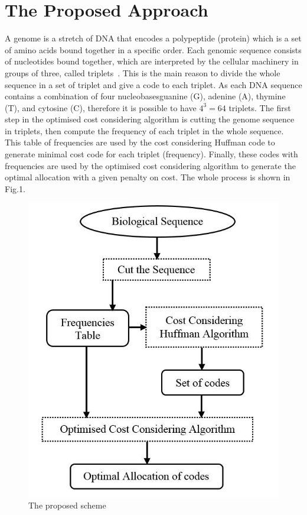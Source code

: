 \documentclass{singlecol-new}
\theoremstyle{TH}{
\newtheorem{lemma}{Lemma}
\newtheorem{theorem}[lemma]{Theorem}
\newtheorem{corrolary}[lemma]{Corrolary}
\newtheorem{conjecture}[lemma]{Conjecture}
\newtheorem{proposition}[lemma]{Proposition}
\newtheorem{claim}[lemma]{Claim}
\newtheorem{stheorem}[lemma]{Wrong Theorem}
}
\theoremstyle{THrm}{
\newtheorem{definition}{Definition}
\newtheorem{question}{Question}
\newtheorem{remark}{Remark}
\newtheorem{scheme}{Scheme}
}
\theoremstyle{THhit}{
\newtheorem{case}{Case}[section]
}
\begin{document}
\section{The Proposed Approach}
\label{sec3}
A genome is a stretch of DNA that encodes  a polypeptide (protein) which is a set of amino acids bound together in a specific order. Each genomic sequence consists of nucleotides bound together, which are interpreted by the cellular machinery in groups of three, called triplets~\citep{Harvey00}. This is the main reason to divide the whole sequence in a set of triplet and give a code to each triplet. As each DNA sequence contains a combination of four nucleobases\textemdash guanine (G), adenine (A), thymine (T), and cytosine (C), therefore it is possible to have $4^3=64$ triplets.  The first step in the optimised cost considering algorithm is cutting the genome sequence in triplets, then compute the frequency of each triplet in the whole sequence. This table of frequencies are used by the cost considering Huffman code to generate minimal cost code for each triplet (frequency). Finally, these codes with frequencies are used by the optimised cost considering algorithm to generate the optimal allocation with a given  penalty on cost. The whole process is shown in Fig.1.%

\begin{figure}[!thpb]
\caption{The proposed scheme}
\begin{center}
\includegraphics[scale=0.3]{Images/Drawing3_1.jpg}

\end{center}
\label{Fig1}
\end{figure}
\end{document}
